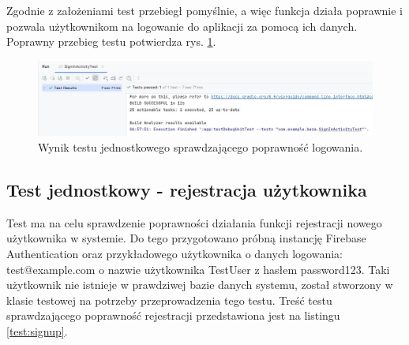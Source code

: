 Zgodnie z założeniami test przebiegł pomyślnie, a więc funkcja działa poprawnie i pozwala użytkownikom na logowanie do aplikacji za pomocą ich danych. Poprawny przebieg testu potwierdza rys. \ref{result:login}. \\
\begin{figure}[H]
    \centering
    \includegraphics[scale=0.5]{img/test/login-wynik.jpg}
    \caption{Wynik testu jednostkowego sprawdzającego poprawność logowania.}
    \label{result:login}
\end{figure}

\subsection*{Test jednostkowy - rejestracja użytkownika}
Test ma na celu sprawdzenie poprawności działania funkcji rejestracji nowego użytkownika w systemie. Do tego przygotowano próbną instancję Firebase Authentication oraz przykładowego użytkownika o danych logowania: test@example.com o nazwie użytkownika TestUser z hasłem password123. Taki użytkownik nie istnieje w prawdziwej bazie danych systemu, został stworzony w klasie testowej na potrzeby  przeprowadzenia tego testu. Treść testu sprawdzającego poprawność rejestracji przedstawiona jest na listingu \ref{test:signup}. \\

